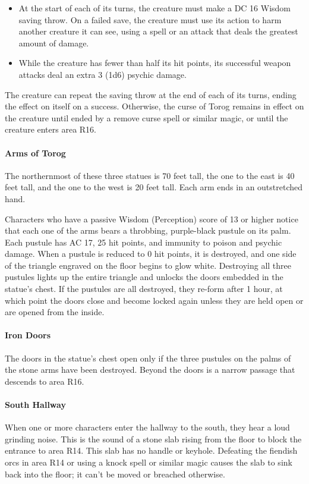 \documentclass[10pt,a4paper,twoside,twocolumn,openany,nodeprecatedcode]{dndbook}
\begin{document}
\begin{itemize}
\item At the start of each of its turns, the creature must make a DC 16 Wisdom saving throw. On a failed save, the creature must use its action to harm another creature it can see, using a spell or an attack that deals the greatest amount of damage.
\item While the creature has fewer than half its hit points, its successful weapon attacks deal an extra 3 (1d6) psychic damage.
\end{itemize}

The creature can repeat the saving throw at the end of each of its turns, ending the effect on itself on a success. Otherwise, the curse of Torog remains in effect on the creature until ended by a remove curse spell or similar magic, or until the creature enters area R16.

\paragraph{Arms of Torog}
The northernmost of these three statues is 70 feet tall, the one to the east is 40 feet tall, and the one to the west is 20 feet tall. Each arm ends in an outstretched hand.

Characters who have a passive Wisdom (Perception) score of 13 or higher notice that each one of the arms bears a throbbing, purple-black pustule on its palm. Each pustule has AC 17, 25 hit points, and immunity to poison and psychic damage. When a pustule is reduced to 0 hit points, it is destroyed, and one side of the triangle engraved on the floor begins to glow white. Destroying all three pustules lights up the entire triangle and unlocks the doors embedded in the statue's chest. If the pustules are all destroyed, they re-form after 1 hour, at which point the doors close and become locked again unless they are held open or are opened from the inside.

\paragraph{Iron Doors}
The doors in the statue's chest open only if the three pustules on the palms of the stone arms have been destroyed. Beyond the doors is a narrow passage that descends to area R16.

\paragraph{South Hallway}
When one or more characters enter the hallway to the south, they hear a loud grinding noise. This is the sound of a stone slab rising from the floor to block the entrance to area R14. This slab has no handle or keyhole. Defeating the fiendish orcs in area R14 or using a knock spell or similar magic causes the slab to sink back into the floor; it can't be moved or breached otherwise.
\end{document}
